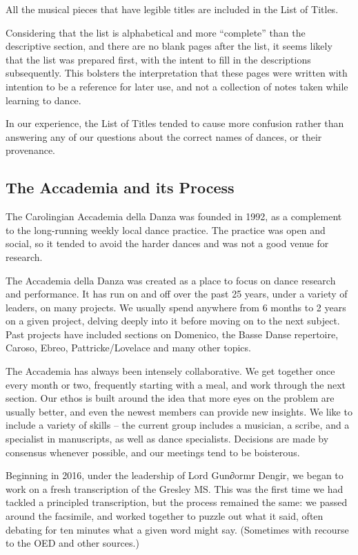 \documentclass[12pt,letter]{article} %
\begin{document}
All the musical pieces that have legible titles are included in the List of Titles. 

Considering that the list is alphabetical and more “complete” than the descriptive section, and there are no blank pages after the list, it seems likely that the list was prepared first, with the intent to fill in the descriptions subsequently. This bolsters the interpretation that these pages were written with intention to be a reference for later use, and not a collection of notes taken while learning to dance. 

In our experience, the List of Titles tended to cause more confusion rather than answering any of our questions about the correct names of dances, or their provenance.

\subsection{The Accademia and its Process}

The Carolingian Accademia della Danza was founded in 1992, as a complement to the long-running weekly local dance practice.  The practice was open and social, so it tended to avoid the harder dances and was not a good venue for research.

The Accademia della Danza was created as a place to focus on dance research and performance.  It has run on and off over the past 25 years, under a variety of leaders, on many projects.  We usually spend anywhere from 6 months to 2 years on a given project, delving deeply into it before moving on to the next subject.  Past projects have included sections on Domenico, the Basse Danse repertoire, Caroso, Ebreo, Pattricke/Lovelace and many other topics.

The Accademia has always been intensely collaborative.  We get together once every month or two, frequently starting with a meal, and work through the next section.  Our ethos is built around the idea that more eyes on the problem are usually better, and even the newest members can provide new insights.  We like to include a variety of skills -- the current group includes a musician, a scribe, and a specialist in manuscripts, as well as dance specialists.  Decisions are made by consensus whenever possible, and our meetings tend to be boisterous.

Beginning in 2016, under the leadership of Lord Gun∂ormr Dengir, we began to work on a fresh transcription of the Gresley MS.  This was the first time we had tackled a principled transcription, but the process remained the same: we passed around the facsimile, and worked together to puzzle out what it said, often debating for ten minutes what a given word might say.  (Sometimes with recourse to the OED and other sources.) 
\end{document}
